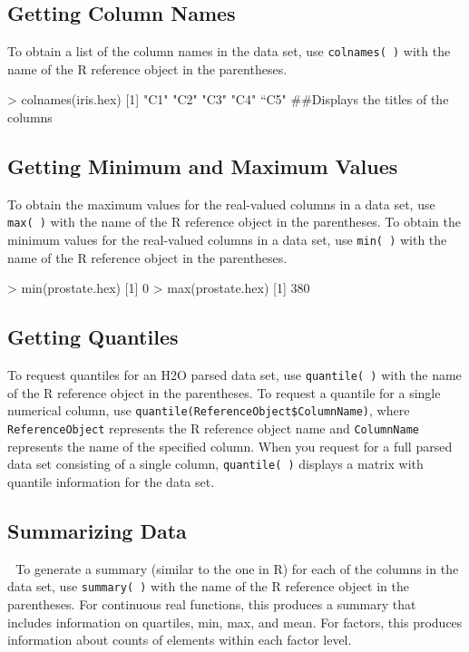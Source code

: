 \documentclass[11pt]{article}
\begin{document}
\subsection{Getting Column Names}

To obtain a list of the column names in the data set, use {\texttt{colnames( )}} with the name of the R reference object in the parentheses. 

\begin{spverbatim}
> colnames(iris.hex)
[1] "C1" "C2" "C3" "C4" “C5" ##Displays the titles of the columns
\end{spverbatim}


\subsection{Getting Minimum and Maximum Values}

To obtain the maximum values for the real-valued columns in a data set, use {\texttt{max( )}} with the name of the R reference object in the parentheses. 
To obtain the minimum values for the real-valued columns in a data set, use {\texttt{min( )}} with the name of the R reference object in the parentheses. 
\begin{spverbatim}
> min(prostate.hex)
[1] 0
> max(prostate.hex)
[1] 380
\end{spverbatim}


\subsection{Getting Quantiles}

To request quantiles for an H2O parsed data set, use {\texttt{quantile( )}} with the name of the R reference object in the parentheses. 
To request a quantile for a single numerical column, use {\texttt{quantile(ReferenceObject\$ColumnName)}},  where {\texttt{ReferenceObject}} represents the R reference object name and {\texttt{ColumnName}} represents the name of the specified column. 
When you request for a full parsed data set consisting of a single column, {\texttt{quantile( )}} displays a matrix with quantile information for the data set. 



\subsection{Summarizing Data} 
To generate a summary (similar to the one in R) for each of the columns in the data set, use {\texttt{summary( )}} with the name of the R reference object in the parentheses. 
For continuous real functions, this produces a summary that includes information on quartiles, min, max, and mean. 
For factors, this produces information about counts of elements within each factor level. 
\end{document}
